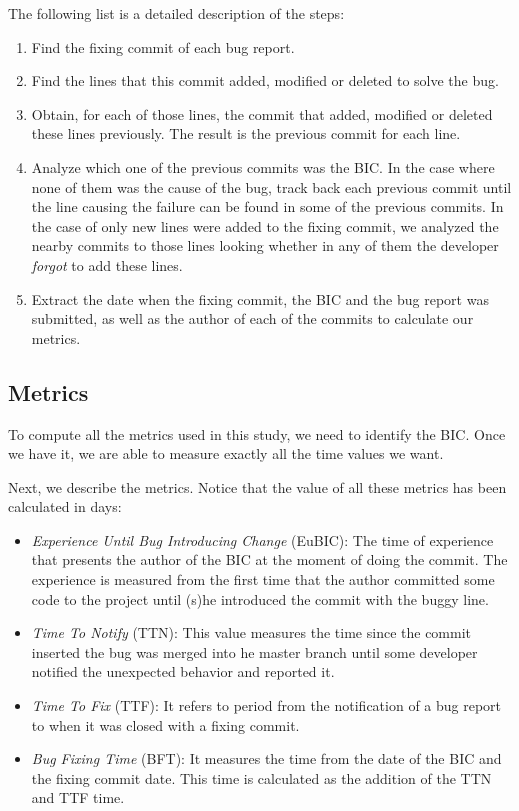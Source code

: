 \documentclass[10pt, conference]{IEEEtran}
\begin{document}
The following list is a detailed description of the steps: 

\begin{enumerate}
		\item Find the fixing commit of each bug report.
		\item Find the lines that this commit added, modified or deleted to solve the bug.
		\item Obtain, for each of those lines, the commit that added, modified or deleted these lines previously. The result is the previous commit for each line.
		\item Analyze which one of the previous commits was the BIC. In the case where none of them was the cause of the bug, track back each previous commit until the line causing the failure can be found in some of the previous commits. In the case of only new lines were added to the fixing commit, we analyzed the nearby commits to those lines looking whether in any of them the developer \emph{forgot} to add these lines.
		\item Extract the date when the fixing commit, the BIC and the bug report was submitted, as well as the author of each of the commits to calculate our metrics.	
\end{enumerate} 


\subsection{Metrics}

To compute all the metrics used in this study, we need to identify the BIC. Once we have it, we are able to measure exactly all the time values we want.  

Next, we describe the metrics. Notice that the value of all these metrics has been calculated in days: 

\begin{itemize}
		\item \emph{Experience Until Bug Introducing Change} (EuBIC): The time of experience that presents the author of the BIC at the moment of doing the commit. The experience is measured from the first time that the author committed some code to the project until (s)he introduced the commit with the buggy line.
		\item \emph{Time To Notify} (TTN): This value measures the time since the commit inserted the bug was merged into he master branch until some developer notified the unexpected behavior and reported it. 
		\item \emph{Time To Fix} (TTF): It refers to period from the notification of a bug report to when it was closed with a fixing commit.
		\item \emph{Bug Fixing Time} (BFT): It measures the time from the date of the BIC and the fixing commit date. This time is calculated as the addition of the TTN and TTF time.
\end{itemize} 
\end{document}
